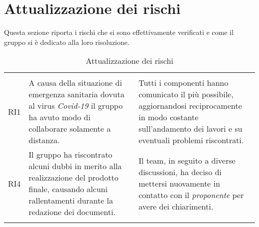 \section{Attualizzazione dei rischi}

Questa sezione riporta i rischi che si sono effettivamente verificati e come il gruppo si è dedicato alla loro risoluzione.

\begin{longtable}{C{2.5cm} C{7cm} C{7cm}} 
 	 &
 	 &
 	 \\
 	
 	RI1 & A causa della situazione di emergenza sanitaria dovuta al virus \textit{Covid-19} il gruppo ha avuto modo di collaborare solamente a distanza. & Tutti i componenti hanno comunicato il più possibile, aggiornandosi reciprocamente in modo costante sull'andamento dei lavori e su eventuali problemi riscontrati. \\
 	RI4 & Il gruppo ha riscontrato alcuni dubbi in merito alla realizzazione del prodotto finale, causando alcuni rallentamenti durante la redazione dei documenti. & Il team, in seguito a diverse discussioni, ha deciso di mettersi nuovamente in contatto con il \textit{proponente} per avere dei chiarimenti. \\
 	
 	\caption{Attualizzazione dei rischi}
\end{longtable}